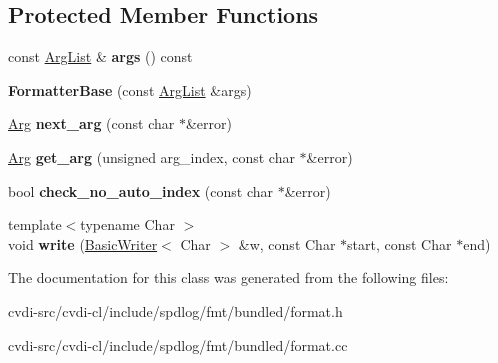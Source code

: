 \subsection*{Protected Member Functions}
\begin{DoxyCompactItemize}
\item 
const \hyperlink{classfmt_1_1ArgList}{Arg\+List} \& {\bfseries args} () const \hypertarget{classfmt_1_1internal_1_1FormatterBase_a6b7a3a49a08e76e915400748f3cbe7fc}{}\label{classfmt_1_1internal_1_1FormatterBase_a6b7a3a49a08e76e915400748f3cbe7fc}

\item 
{\bfseries Formatter\+Base} (const \hyperlink{classfmt_1_1ArgList}{Arg\+List} \&args)\hypertarget{classfmt_1_1internal_1_1FormatterBase_a5a27cf6bbba1b7e159bb21e12453c216}{}\label{classfmt_1_1internal_1_1FormatterBase_a5a27cf6bbba1b7e159bb21e12453c216}

\item 
\hyperlink{structfmt_1_1internal_1_1Arg}{Arg} {\bfseries next\+\_\+arg} (const char $\ast$\&error)\hypertarget{classfmt_1_1internal_1_1FormatterBase_ac3d5811aa9b695596fe0dc67f870e3d4}{}\label{classfmt_1_1internal_1_1FormatterBase_ac3d5811aa9b695596fe0dc67f870e3d4}

\item 
\hyperlink{structfmt_1_1internal_1_1Arg}{Arg} {\bfseries get\+\_\+arg} (unsigned arg\+\_\+index, const char $\ast$\&error)\hypertarget{classfmt_1_1internal_1_1FormatterBase_ad5baca90f220f3f54c0c4a620ec80b7b}{}\label{classfmt_1_1internal_1_1FormatterBase_ad5baca90f220f3f54c0c4a620ec80b7b}

\item 
bool {\bfseries check\+\_\+no\+\_\+auto\+\_\+index} (const char $\ast$\&error)\hypertarget{classfmt_1_1internal_1_1FormatterBase_a27444362817694c52d86723bd2b62390}{}\label{classfmt_1_1internal_1_1FormatterBase_a27444362817694c52d86723bd2b62390}

\item 
{\footnotesize template$<$typename Char $>$ }\\void {\bfseries write} (\hyperlink{classfmt_1_1BasicWriter}{Basic\+Writer}$<$ Char $>$ \&w, const Char $\ast$start, const Char $\ast$end)\hypertarget{classfmt_1_1internal_1_1FormatterBase_ab29b5470b0f02edfde9b81ba24a51bf6}{}\label{classfmt_1_1internal_1_1FormatterBase_ab29b5470b0f02edfde9b81ba24a51bf6}

\end{DoxyCompactItemize}


The documentation for this class was generated from the following files\+:\begin{DoxyCompactItemize}
\item 
cvdi-\/src/cvdi-\/cl/include/spdlog/fmt/bundled/format.\+h\item 
cvdi-\/src/cvdi-\/cl/include/spdlog/fmt/bundled/format.\+cc\end{DoxyCompactItemize}
